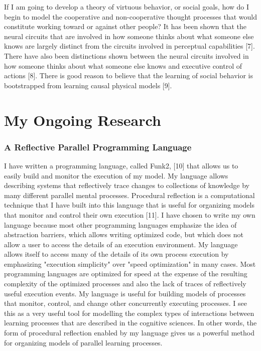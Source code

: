If I am going to develop a theory of virtuous behavior, or social
goals, how do I begin to model the cooperative and non-cooperative
thought processes that would constitute working toward or against
other people? It has been shown that the neural circuits that are
involved in how someone thinks about what someone else knows are
largely distinct from the circuits involved in perceptual capabilities
[7]. There have also been distinctions shown between the neural
circuits involved in how someone thinks about what someone else knows
and executive control of actions [8]. There is good reason to believe
that the learning of social behavior is bootstrapped from learning
causal physical models [9].

\section{My Ongoing Research}

\subsubsection{A Reflective Parallel Programming Language}

I have written a programming language, called Funk2, [10] that allows
us to easily build and monitor the execution of my model. My
language allows describing systems that reflectively trace changes to
collections of knowledge by many different parallel mental
processes. Procedural reflection is a computational technique that I
have built into this language that is useful for organizing models
that monitor and control their own execution [11]. I have chosen to
write my own language because most other programming languages
emphasize the idea of abstraction barriers, which allows writing
optimized code, but which does not allow a user to access the details
of an execution environment. My language allows itself to access many
of the details of its own process execution by emphasizing "execution
simplicity" over "speed optimization" in many cases. Most programming
languages are optimized for speed at the expense of the resulting
complexity of the optimized processes and also the lack of traces of
reflectively useful execution events. My language is useful for
building models of processes that monitor, control, and change other
concurrently executing processes. I see this as a very useful tool
for modelling the complex types of interactions between learning
processes that are described in the cognitive sciences. In other
words, the form of procedural reflection enabled by my language gives
us a powerful method for organizing models of parallel learning
processes.

